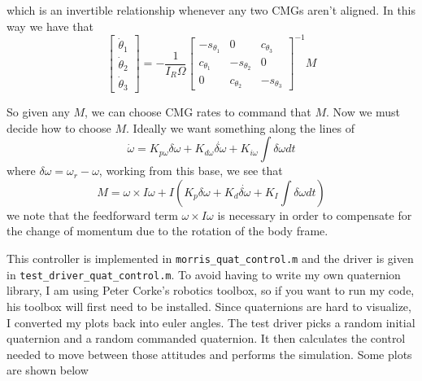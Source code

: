 \documentclass[a4paper]{article}
\begin{document}
which is an invertible relationship whenever any two CMGs aren't aligned. In this way we have that
\[
  \begin{bmatrix}
    \dot{\theta}_1 \\
    \dot{\theta}_2 \\
    \dot{\theta}_3
  \end{bmatrix} =
  -\frac{1}{I_R \Omega} 
  \begin{bmatrix}
    -s_{\theta_1} & 0 & c_{\theta_3} \\
    c_{\theta_1} & -s_{\theta_2} & 0\\
    0 & c_{\theta_2} & -s_{\theta_3}
  \end{bmatrix}^{-1} M
\]

So given any $M$, we can choose CMG rates to command that $M$. Now we must decide how to choose $M$. Ideally we want something along the lines of
\[
  \dot{\omega} = K_{p\omega} \delta \omega + K_{d\omega} \dot{\delta \omega} + K_{i\omega} \int \delta \omega dt
\]
where $\delta \omega = \omega_r - \omega$, working from this base, we see that
\[
  M = \omega \times I \omega + I \left( K_p \delta \omega + K_d \dot{\delta \omega} + K_I \int \delta \omega dt \right)
\]
we note that the feedforward term $\omega \times I \omega$ is necessary in order to compensate for the change of momentum due to the rotation of the body frame.

This controller is implemented in \texttt{morris\_quat\_control.m} and the driver is given in \texttt{test\_driver\_quat\_control.m}. To avoid having to write my own quaternion library, I am using Peter Corke's robotics toolbox, so if you want to run my code, his toolbox will first need to be installed. Since quaternions are hard to visualize, I converted my plots back into euler angles. The test driver picks a random initial quaternion and a random commanded quaternion. It then calculates the control needed to move between those attitudes and performs the simulation. Some plots are shown below
\end{document}
